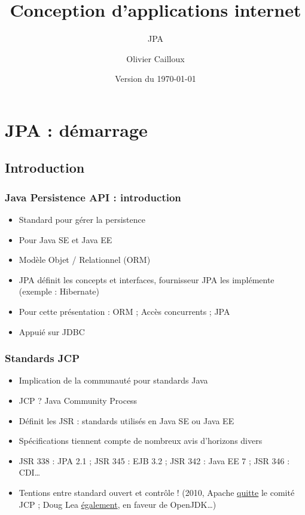\documentclass[english, french]{beamer}
\title{Conception d’applications internet}
\subtitle{JPA}
\author{Olivier Cailloux}
\institute[LAMSADE]{LAMSADE, Université Paris-Dauphine}
\date{Version du \today}
\begin{document}


\begin{frame}[plain]
   \titlepage
\end{frame}
\addtocounter{framenumber}{-1}

\section{JPA : démarrage}
\subsection{Introduction}
\begin{frame}
	\frametitle{Java Persistence API : introduction}
	\begin{itemize}
		\item Standard pour gérer la persistence
		\item Pour Java SE et Java EE
		\item Modèle Objet / Relationnel (ORM)
		\item JPA définit les concepts et interfaces, fournisseur JPA les implémente (exemple : Hibernate)
		\item Pour cette présentation : ORM ; Accès concurrents ; JPA
		\item Appuié sur JDBC
	\end{itemize}
\end{frame}

\begin{frame}
	\frametitle{Standards JCP}
	\begin{itemize}
		\item Implication de \og{}la communauté\fg{} pour standards Java
		\item JCP ? \pause Java Community Process \pause
		\item Définit les JSR : standards utilisés en Java SE ou Java EE
		\item Spécifications tiennent compte de nombreux avis d’horizons divers
		\item JSR 338 : JPA 2.1 ; JSR 345 : EJB 3.2 ; JSR 342 : Java EE 7 ; JSR 346 : CDI…
		\item Tentions entre standard ouvert et contrôle ! (2010, Apache \href{https://blogs.apache.org/foundation/entry/the_asf_resigns_from_the}{quitte} le comité JCP ; Doug Lea \href{http://gee.cs.oswego.edu/dl/html/jcp22oct10.html}{également}, en faveur de OpenJDK…)
	\end{itemize}
\end{frame}
\end{document}
